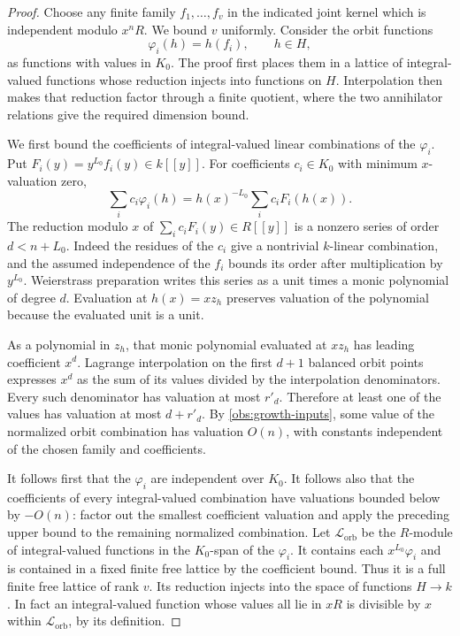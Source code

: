 \begin{proof}
Choose any finite family $f_1,\ldots,f_v$ in the indicated joint
kernel which is independent modulo $x^nR$.  We bound $v$ uniformly.
Consider the orbit functions
\[
 \varphi_i(h)=h(f_i),\qquad h\in H,
\]
as functions with values in $K_0$.  The proof first places them
in a lattice of integral-valued functions whose reduction injects
into functions on $H$.  Interpolation then makes that reduction
factor through a finite quotient, where the two annihilator
relations give the required dimension bound.

We first bound the coefficients of integral-valued linear
combinations of the $\varphi_i$.  Put
$F_i(y)=y^{L_0}f_i(y)\in k[[y]]$.
For coefficients $c_i\in K_0$ with minimum $x$-valuation zero,
\[
 \sum_i c_i \varphi_i(h)
   =h(x)^{-L_0}\sum_i c_i F_i(h(x)).
\]
The reduction modulo $x$ of $\sum_i c_iF_i(y)\in R[[y]]$ is a
nonzero series of order $d<n+L_0$.  Indeed the residues of the $c_i$
give a nontrivial $k$-linear combination, and the assumed independence
of the $f_i$ bounds its order after multiplication by $y^{L_0}$.
Weierstrass preparation writes this series as a unit times a monic
polynomial of degree $d$.  Evaluation at $h(x)=xz_h$ preserves
valuation of the polynomial because the evaluated unit is a unit.

As a polynomial in $z_h$, that monic polynomial evaluated at $xz_h$
has leading coefficient $x^d$.  Lagrange interpolation on the first
$d+1$ balanced orbit points expresses $x^d$ as the sum of its values
divided by the interpolation denominators.  Every such denominator
has valuation at most $r'_d$.  Therefore at least one of the values
has valuation at most $d+r'_d$.  By
\eqref{obs:growth-inputs}, some value of the normalized orbit
combination has valuation $O(n)$, with constants independent of
the chosen family and coefficients.

It follows first that the $\varphi_i$ are independent over $K_0$.
It follows also that the coefficients of every integral-valued
combination have valuations bounded below by $-O(n)$: factor out
the smallest coefficient valuation and apply the preceding upper
bound to the remaining normalized combination.
Let $\mathcal L_{\mathrm{orb}}$ be the $R$-module of integral-valued functions in
the $K_0$-span of the $\varphi_i$.  It contains each $x^{L_0}\varphi_i$ and is
contained in a fixed finite free lattice by the coefficient bound.
Thus it is a full finite free lattice of rank $v$.
Its reduction injects into the space of functions $H\to k$.
In fact an integral-valued function whose values all lie in $xR$
is divisible by $x$ within $\mathcal L_{\mathrm{orb}}$, by its definition.


\end{proof}
